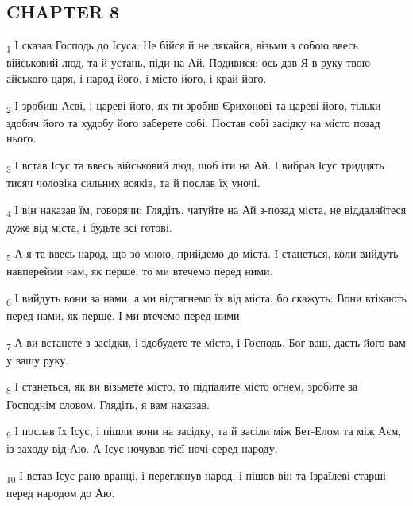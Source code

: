 \subsection{CHAPTER 8}
\begin{tcolorbox}
\textsubscript{1} І сказав Господь до Ісуса: Не бійся й не лякайся, візьми з собою ввесь військовий люд, та й устань, піди на Ай. Подивися: ось дав Я в руку твою айського царя, і народ його, і місто його, і край його.
\end{tcolorbox}
\begin{tcolorbox}
\textsubscript{2} І зробиш Аєві, і цареві його, як ти зробив Єрихонові та цареві його, тільки здобич його та худобу його заберете собі. Постав собі засідку на місто позад нього.
\end{tcolorbox}
\begin{tcolorbox}
\textsubscript{3} І встав Ісус та ввесь військовий люд, щоб іти на Ай. І вибрав Ісус тридцять тисяч чоловіка сильних вояків, та й послав їх уночі.
\end{tcolorbox}
\begin{tcolorbox}
\textsubscript{4} І він наказав їм, говорячи: Глядіть, чатуйте на Ай з-позад міста, не віддаляйтеся дуже від міста, і будьте всі готові.
\end{tcolorbox}
\begin{tcolorbox}
\textsubscript{5} А я та ввесь народ, що зо мною, прийдемо до міста. І станеться, коли вийдуть навперейми нам, як перше, то ми втечемо перед ними.
\end{tcolorbox}
\begin{tcolorbox}
\textsubscript{6} І вийдуть вони за нами, а ми відтягнемо їх від міста, бо скажуть: Вони втікають перед нами, як перше. І ми втечемо перед ними.
\end{tcolorbox}
\begin{tcolorbox}
\textsubscript{7} А ви встанете з засідки, і здобудете те місто, і Господь, Бог ваш, дасть його вам у вашу руку.
\end{tcolorbox}
\begin{tcolorbox}
\textsubscript{8} І станеться, як ви візьмете місто, то підпалите місто огнем, зробите за Господнім словом. Глядіть, я вам наказав.
\end{tcolorbox}
\begin{tcolorbox}
\textsubscript{9} І послав їх Ісус, і пішли вони на засідку, та й засіли між Бет-Елом та між Аєм, із заходу від Аю. А Ісус ночував тієї ночі серед народу.
\end{tcolorbox}
\begin{tcolorbox}
\textsubscript{10} І встав Ісус рано вранці, і переглянув народ, і пішов він та Ізраїлеві старші перед народом до Аю.
\end{tcolorbox}
